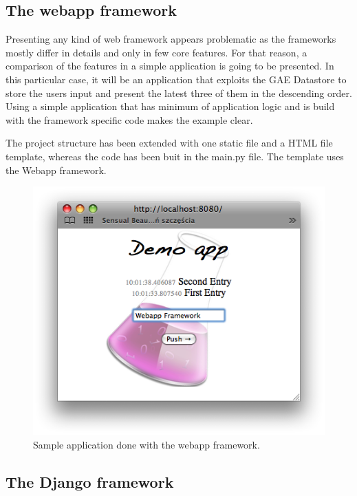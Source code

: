\subsection{The webapp framework}\label{subsec:webapp}
Presenting any kind of web framework appears problematic as the frameworks mostly differ in details and only in few core features. For that reason, a comparison of the features in a simple application is going to be presented. In this particular case, it will be an application that exploits the GAE Datastore to store the users input and present the latest three of them in the descending order. Using a simple application that has minimum of application logic and is build with the framework specific code makes the example clear. 

The project structure has been extended with one static file and a HTML file template, whereas the code has been buit in the main.py file. The template uses the Webapp framework.

\newpage


\begin{figure}[ht]
\begin{center}
\includegraphics[scale=0.6]{img/webapp_sample.png}
\caption{Sample application done with the webapp framework.}
\label{fig:webapp_sample}
\end{center}
\end{figure}

\subsection{The Django framework}\label{subsec:django}
